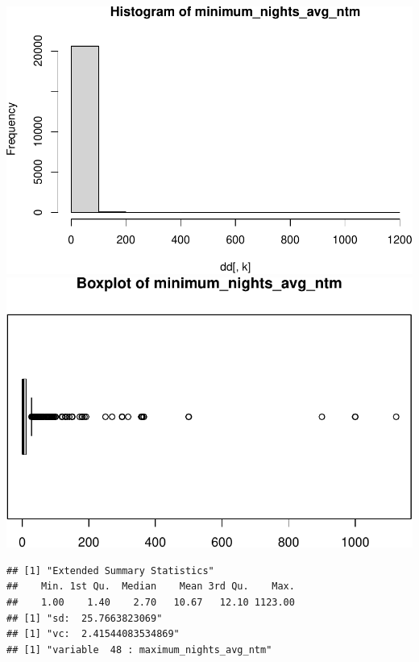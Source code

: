 \includegraphics{anal_files/figure-latex/unnamed-chunk-7-28.pdf}
\includegraphics{anal_files/figure-latex/unnamed-chunk-7-29.pdf}

\begin{verbatim}
## [1] "Extended Summary Statistics"
##    Min. 1st Qu.  Median    Mean 3rd Qu.    Max. 
##    1.00    1.40    2.70   10.67   12.10 1123.00 
## [1] "sd:  25.7663823069"
## [1] "vc:  2.41544083534869"
## [1] "variable  48 : maximum_nights_avg_ntm"
\end{verbatim}

